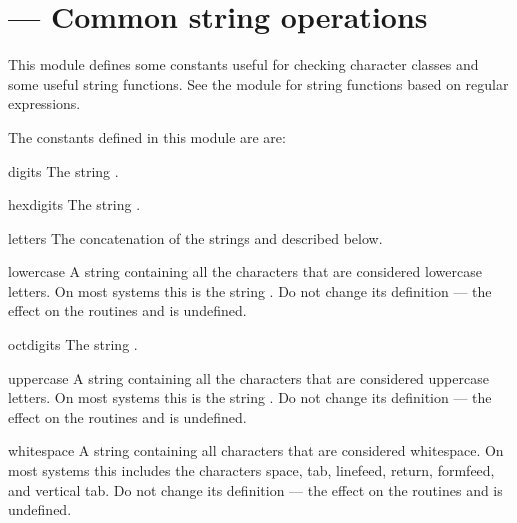 \section{ ---
         Common string operations}



This module defines some constants useful for checking character
classes and some useful string functions.  See the module
 for string functions based on regular
expressions.

The constants defined in this module are are:

\begin{datadesc}{digits}
  The string .
\end{datadesc}

\begin{datadesc}{hexdigits}
  The string .
\end{datadesc}

\begin{datadesc}{letters}
  The concatenation of the strings  and
   described below.
\end{datadesc}

\begin{datadesc}{lowercase}
  A string containing all the characters that are considered lowercase
  letters.  On most systems this is the string
  .  Do not change its definition ---
  the effect on the routines  and
   is undefined.
\end{datadesc}

\begin{datadesc}{octdigits}
  The string .
\end{datadesc}

\begin{datadesc}{uppercase}
  A string containing all the characters that are considered uppercase
  letters.  On most systems this is the string
  .  Do not change its definition ---
  the effect on the routines  and
   is undefined.
\end{datadesc}

\begin{datadesc}{whitespace}
  A string containing all characters that are considered whitespace.
  On most systems this includes the characters space, tab, linefeed,
  return, formfeed, and vertical tab.  Do not change its definition ---
  the effect on the routines  and 
  is undefined.
\end{datadesc}

